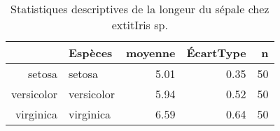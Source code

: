 \begin{table}[ht]
\centering
\begin{tabular}{rlrrr}
  \hline
 & Espèces & moyenne & ÉcartType & n \\ 
  \hline
setosa & setosa & 5.01 & 0.35 &  50 \\ 
  versicolor & versicolor & 5.94 & 0.52 &  50 \\ 
  virginica & virginica & 6.59 & 0.64 &  50 \\ 
   \hline
\end{tabular}
\caption{Statistiques descriptives de la longeur du sépale chez 	extit{Iris sp.}} 
\end{table}
